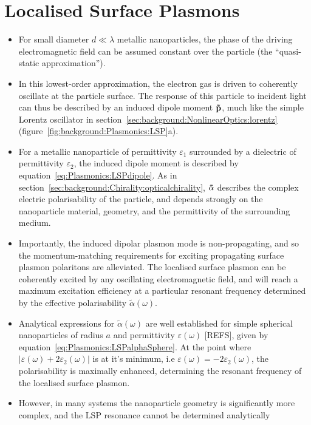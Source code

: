 \section{Localised Surface Plasmons}\label{sec:background:Plasmonics:Metamaterials}
\begin{itemize}
    \item For small diameter $d \ll \lambda$ metallic nanoparticles, the phase of the driving electromagnetic field can be assumed constant over the particle (the ``quasi-static approximation'').
    \item In this lowest-order approximation, the electron gas is driven to coherently oscillate at the particle surface. The response of this particle to incident light can thus be described by an induced dipole moment $\bf{\tilde p}$, much like the simple Lorentz oscillator in section~\ref{sec:background:NonlinearOptics:lorentz} (figure~\ref{fig:background:Plasmonics:LSP}a).
    \item For a metallic nanoparticle of permittivity $\varepsilon_1$ surrounded by a dielectric of permittivity $\varepsilon_2$, the induced dipole moment is described by equation~\ref{eq:Plasmonics:LSPdipole}. As in section~\ref{sec:background:Chirality:opticalchirality}, $\bf{\tilde \alpha }$ describes the complex electric polarisability of the particle, and depends strongly on the nanoparticle material, geometry, and the permittivity of the surrounding medium.
    \item Importantly, the induced dipolar plasmon mode is non-propagating, and so the momentum-matching requirements for exciting propagating surface plasmon polaritons are alleviated. The localised surface plasmon can be coherently excited by any oscillating electromagnetic field, and will reach a maximum excitation efficiency at a particular resonant frequency determined by the effective polarisability ${\tilde \alpha }(\omega)$.
    \item Analytical expressions for ${\tilde \alpha }(\omega)$ are well established for simple spherical nanoparticles of radius $a$ and permittivity $\varepsilon(\omega)$ [REFS], given by equation~\ref{eq:Plasmonics:LSPalphaSphere}. At the point where $\lvert \varepsilon (\omega) + 2\varepsilon_2 (\omega) \rvert$ is at it's minimum, i.e $\varepsilon (\omega) = -2\varepsilon_2 (\omega)$, the polarisability is maximally enhanced, determining the resonant frequency of the localised surface plasmon.
    \item However, in many systems the nanoparticle geometry is significantly more complex, and the LSP resonance cannot be determined analytically
\end{itemize}


